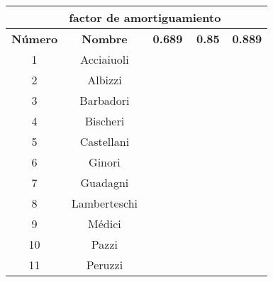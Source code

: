 \begin{center}
\begin{tabular}{|c|c|c|c|c|}
    \hline
    \rowcolor{azul} \multicolumn{2}{|c|}{\textbf{Familia}}&\multicolumn{3}{c|}{\textbf{factor de amortiguamiento}} \\ \hline
    \rowcolor{azul} \textbf{Número} & \textbf{Nombre} & \textbf{0.689} & \textbf{0.85} & \textbf{0.889} \\ \hline
    1 & Acciaiuoli & \cellcolor{orange!25}{0.035479330884659266} & \cellcolor{orange!25}{0.030616772148504806} & \cellcolor{orange!25}{0.029570860773009678} \\ \hline
    2 & Albizzi & \cellcolor{blue!25}{0.07716802121188286} & \cellcolor{blue!25}{0.07626307878565806} & \cellcolor{blue!25}{0.0754079780067131} \\ \hline
    3 & Barbadori & \cellcolor{yellow!25}{0.051931088549229475} & \cellcolor{yellow!25}{0.05150657580871245} & \cellcolor{yellow!25}{0.05158376088937878} \\ \hline
    4 & Bischeri & \cellcolor{violet!25}{0.06922543274019202} & \cellcolor{violet!25}{0.07070219766081234} & \cellcolor{violet!25}{0.07079660905958886} \\ \hline
    5 & Castellani & \cellcolor{blue!25}{0.07163319737839043} & \cellcolor{blue!25}{0.0737287188007328} & \cellcolor{blue!25}{0.07428425236120793} \\ \hline
    6 & Ginori & \cellcolor{orange!25}{0.03803511605255818} & \cellcolor{orange!25}{0.031508862421612535} & \cellcolor{orange!25}{0.029691539730023933} \\ \hline
    7 & Guadagni & \cellcolor{blue!25}{0.08988386279832349} & \cellcolor{blue!25}{0.08877069919427012} & \cellcolor{blue!25}{0.08747508847562997} \\ \hline
    8 & Lamberteschi & \cellcolor{orange!25}{0.03579468921457365} & \cellcolor{orange!25}{0.02876476367779198} & \cellcolor{orange!25}{0.026786980661079315} \\ \hline
    9 & Médici & \cellcolor{green!25}{0.1320795678121636} & \cellcolor{green!25}{0.14622904976114215} & \cellcolor{green!25}{0.15000147486369722} \\ \hline
    10 & Pazzi & \cellcolor{violet!25}{0.06254850473182186} & \cellcolor{violet!25}{0.06830356213169397} & \cellcolor{violet!25}{0.07062222025284678} \\ \hline
    11 & Peruzzi & \cellcolor{violet!25}{0.0640338188350678} & \cellcolor{violet!25}{0.06509509970488973} & \cellcolor{violet!25}{0.06531503351579934} \\ \hline

\end{tabular}
\end{center}
